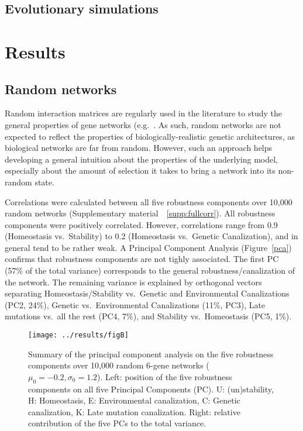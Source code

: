 \documentclass{article}
\newcommand{\SupMat}{Supplementary material~}
\begin{document}
\subsection{Evolutionary simulations}


\section{Results}

\subsection{Random networks}

Random interaction matrices are regularly used in the literature to study the general properties of gene networks (e.g.\ \cite{CTH11,PBF12}. As such, random networks are not expected to reflect the properties of biologically-realistic genetic architectures, as biological networks are far from random. However, such an approach helps developing a general intuition about the properties of the underlying model, especially about the amount of selection it takes to bring a network into its non-random state. 

Correlations were calculated between all five robustness components over 10,000 random networks (\SupMat~\ref{supp:fullcorr}). All robustness components were positively correlated. However, correlations range from 0.9 (Homeostasis vs.\ Stability) to 0.2 (Homeostasis vs.\ Genetic Canalization), and in general tend to be rather weak. A Principal Component Analysis (Figure~\ref{pca}) confirms that robustness components are not tighly associated. The first PC (57\% of the total variance) corresponds to the general robustness/canalization of the network. The remaining variance is explained by orthogonal vectors separating Homeostasis/Stability vs.\ Genetic and Environmental Canalizations (PC2, 24\%), Genetic vs.\ Environmental Canalizations (11\%, PC3), Late mutations vs.\ all the rest (PC4, 7\%), and Stability vs.\ Homeostasis (PC5, 1\%). 

\begin{figure}[h!]
\texttt{[image: ../results/figB]}
\caption{\label{fig:pca} Summary of the principal component analysis on the five robustness components over 10,000 random 6-gene networks ($\mu_0=-0.2, \sigma_0=1.2$). Left: position of the five robustness components on all five Principal Components (PC). U: (un)stability, H: Homeostasis, E: Environmental canalization, C: Genetic canalization, K: Late mutation canalization. Right: relative contribution of the five PCs to the total variance.}
\end{figure}
\end{document}
